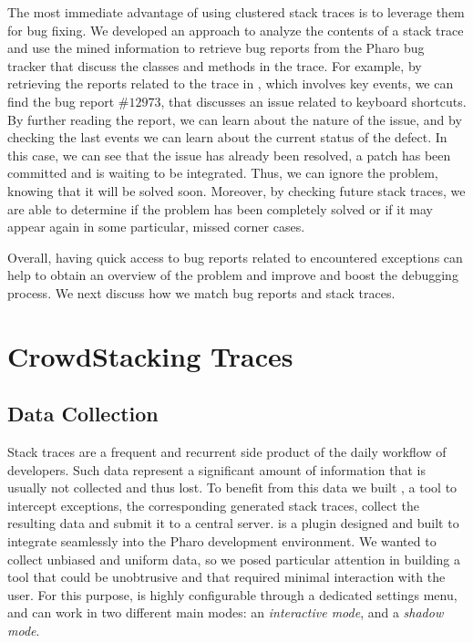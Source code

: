 The most immediate advantage of using clustered stack traces is to leverage them for bug fixing. We developed an approach to analyze the contents of a stack trace and use the mined information to retrieve bug reports from the Pharo bug tracker that discuss the classes and methods in the trace. For example, by retrieving the reports related to the trace in , which involves key events, we can find the bug report $\#12973$, that discusses an issue related to keyboard shortcuts. By further reading the report, we can learn about the nature of the issue, and by checking the last events we can learn about the current status of the defect. In this case, we can see that the issue has already been resolved, a patch has been committed and is waiting to be integrated. Thus, we can ignore the problem, knowing that it will be solved soon. Moreover, by checking future stack traces, we are able to determine if the problem has been completely solved or if it may appear again in some particular, missed corner cases.

Overall, having quick access to bug reports related to encountered exceptions can help to obtain an overview of the problem  and improve and boost the debugging process. We next discuss how we match bug reports and stack traces.

\section{CrowdStacking Traces}\label{sec:dataset}

\subsection{Data Collection}\label{sec:tool}

Stack traces are a frequent and recurrent side product of the daily workflow of developers. Such data represent a significant amount of information that is usually not collected and thus lost. To benefit from this data we built \shr, a tool to intercept exceptions, the corresponding generated stack traces, collect the resulting data and submit it to a central server. \shr is a plugin designed and built to integrate seamlessly into the Pharo development environment. We wanted to collect unbiased and uniform data, so we posed particular attention in building a tool that could be unobtrusive and that required minimal interaction with the user. For this purpose, \shr is highly configurable through a dedicated settings menu, and can work in two different main modes: an \emph{interactive mode}, and a \emph{shadow mode}.

